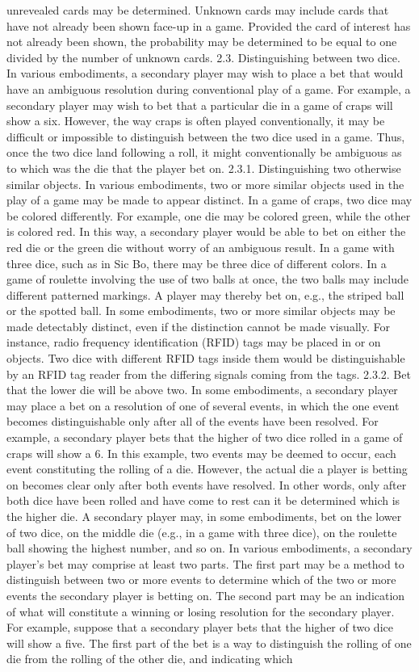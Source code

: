 \documentclass[11pt,a4paper]{article}
\begin{document}
unrevealed cards may be determined. Unknown cards may include cards that have not already been shown face-up in a game. Provided the card of interest has not already been shown, the probability may be determined to be equal to one divided by the number of unknown cards. 2.3. Distinguishing between two dice. In various embodiments, a secondary player may wish to place a bet that would have an ambiguous resolution during conventional play of a game. For example, a secondary player may wish to bet that a particular die in a game of craps will show a six. However, the way craps is often played conventionally, it may be difficult or impossible to distinguish between the two dice used in a game. Thus, once the two dice land following a roll, it might conventionally be ambiguous as to which was the die that the player bet on. 2.3.1. Distinguishing two otherwise similar objects. In various embodiments, two or more similar objects used in the play of a game may be made to appear distinct. In a game of craps, two dice may be colored differently. For example, one die may be colored green, while the other is colored red. In this way, a secondary player would be able to bet on either the red die or the green die without worry of an ambiguous result. In a game with three dice, such as in Sic Bo, there may be three dice of different colors. In a game of roulette involving the use of two balls at once, the two balls may include different patterned markings. A player may thereby bet on, e.g., the striped ball or the spotted ball. In some embodiments, two or more similar objects may be made detectably distinct, even if the distinction cannot be made visually. For instance, radio frequency identification (RFID) tags may be placed in or on objects. Two dice with different RFID tags inside them would be distinguishable by an RFID tag reader from the differing signals coming from the tags. 2.3.2. Bet that the lower die will be above two. In some embodiments, a secondary player may place a bet on a resolution of one of several events, in which the one event becomes distinguishable only after all of the events have been resolved. For example, a secondary player bets that the higher of two dice rolled in a game of craps will show a 6. In this example, two events may be deemed to occur, each event constituting the rolling of a die. However, the actual die a player is betting on becomes clear only after both events have resolved. In other words, only after both dice have been rolled and have come to rest can it be determined which is the higher die. A secondary player may, in some embodiments, bet on the lower of two dice, on the middle die (e.g., in a game with three dice), on the roulette ball showing the highest number, and so on. In various embodiments, a secondary player's bet may comprise at least two parts. The first part may be a method to distinguish between two or more events to determine which of the two or more events the secondary player is betting on. The second part may be an indication of what will constitute a winning or losing resolution for the secondary player. For example, suppose that a secondary player bets that the higher of two dice will show a five. The first part of the bet is a way to distinguish the rolling of one die from the rolling of the other die, and indicating which 
\end{document}
